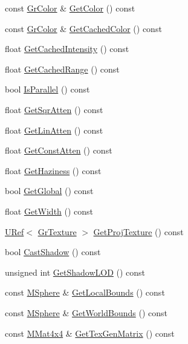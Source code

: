 \begin{CompactItemize}
const \hyperlink{class_gr_color}{GrColor} \& \hyperlink{class_gr_light_d7333ae546a74b630df61693d0b47133}{GetColor} () const 
\item 
const \hyperlink{class_gr_color}{GrColor} \& \hyperlink{class_gr_light_043ab42704a0f7df5f68219efc99d1f9}{GetCachedColor} () const 
\item 
float \hyperlink{class_gr_light_66a3c55f050abc2ef369eb202ce8f52b}{GetCachedIntensity} () const 
\item 
float \hyperlink{class_gr_light_32c3d7ec239d9b3a08869ecff626cc29}{GetCachedRange} () const 
\item 
bool \hyperlink{class_gr_light_e1b04eb006abc19edf83dcdb1e364110}{IsParallel} () const 
\item 
float \hyperlink{class_gr_light_6050783fa4ab84ed938d695ba409dd67}{GetSqrAtten} () const 
\item 
float \hyperlink{class_gr_light_6139a06b502ca8e493b2ce5bb374f9aa}{GetLinAtten} () const 
\item 
float \hyperlink{class_gr_light_928a8bb4de60ade8850be9e349d82c90}{GetConstAtten} () const 
\item 
float \hyperlink{class_gr_light_173d1a635f72cd1788c8b3e61492f01a}{GetHaziness} () const 
\item 
bool \hyperlink{class_gr_light_e39e45c0786bc0331f102c182454fdea}{GetGlobal} () const 
\item 
float \hyperlink{class_gr_light_e8f2c2a5e6500cda537befefa64d0596}{GetWidth} () const 
\item 
\hyperlink{class_u_ref}{URef}$<$ \hyperlink{class_gr_texture}{GrTexture} $>$ \hyperlink{class_gr_light_739b15eaf5c39ae1937546644aab1e42}{GetProjTexture} () const 
\item 
bool \hyperlink{class_gr_light_729edc3bf96dd2a6b98afd324b066c31}{CastShadow} () const 
\item 
unsigned int \hyperlink{class_gr_light_324455a77bfa680b7bbb50e7e2950ae9}{GetShadowLOD} () const 
\item 
const \hyperlink{class_m_sphere}{MSphere} \& \hyperlink{class_gr_light_4b3c3516b76319d07e2a8558ee3e9183}{GetLocalBounds} () const 
\item 
const \hyperlink{class_m_sphere}{MSphere} \& \hyperlink{class_gr_light_e340863c34ce1b15451dff25796a5eee}{GetWorldBounds} () const 
\item 
const \hyperlink{class_m_mat4x4}{MMat4x4} \& \hyperlink{class_gr_light_a440dfedc25621828db76fa3942867f6}{GetTexGenMatrix} () const 
\item 

\end{CompactItemize}
